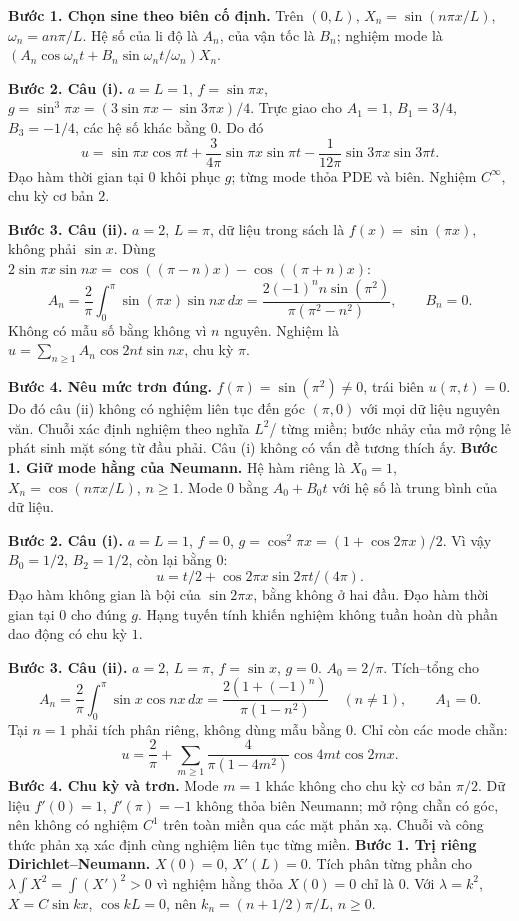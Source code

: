 \textbf{Bước 1. Chọn sine theo biên cố định.} Trên $(0,L)$, $X_n=\sin(n\pi x/L)$, $\omega_n=an\pi/L$. Hệ số của li độ là $A_n$, của vận tốc là $B_n$; nghiệm mode là $(A_n\cos\omega_nt+B_n\sin\omega_nt/\omega_n)X_n$.

\textbf{Bước 2. Câu (i).} $a=L=1$, $f=\sin\pi x$, $g=\sin^3\pi x=(3\sin\pi x-\sin3\pi x)/4$. Trực giao cho $A_1=1$, $B_1=3/4$, $B_3=-1/4$, các hệ số khác bằng $0$. Do đó
\[u=\sin\pi x\cos\pi t+\frac3{4\pi}\sin\pi x\sin\pi t-\frac1{12\pi}\sin3\pi x\sin3\pi t.\]
Đạo hàm thời gian tại $0$ khôi phục $g$; từng mode thỏa PDE và biên. Nghiệm $C^\infty$, chu kỳ cơ bản $2$.

\textbf{Bước 3. Câu (ii).} $a=2$, $L=\pi$, dữ liệu trong sách là $f(x)=\sin(\pi x)$, không phải $\sin x$. Dùng $2\sin\pi x\sin nx=\cos((\pi-n)x)-\cos((\pi+n)x)$:
\[A_n=\frac2\pi\int_0^\pi\sin(\pi x)\sin nx\,dx
=\frac{2(-1)^nn\sin(\pi^2)}{\pi(\pi^2-n^2)},\qquad B_n=0.\]
Không có mẫu số bằng không vì $n$ nguyên. Nghiệm là $u=\sum_{n\ge1}A_n\cos2nt\sin nx$, chu kỳ $\pi$.

\textbf{Bước 4. Nêu mức trơn đúng.} $f(\pi)=\sin(\pi^2)\ne0$, trái biên $u(\pi,t)=0$. Do đó câu (ii) không có nghiệm liên tục đến góc $(\pi,0)$ với mọi dữ liệu nguyên văn. Chuỗi xác định nghiệm theo nghĩa $L^2$/ từng miền; bước nhảy của mở rộng lẻ phát sinh mặt sóng từ đầu phải. Câu (i) không có vấn đề tương thích ấy.
\textbf{Bước 1. Giữ mode hằng của Neumann.} Hệ hàm riêng là $X_0=1$, $X_n=\cos(n\pi x/L)$, $n\ge1$. Mode $0$ bằng $A_0+B_0t$ với hệ số là trung bình của dữ liệu.

\textbf{Bước 2. Câu (i).} $a=L=1$, $f=0$, $g=\cos^2\pi x=(1+\cos2\pi x)/2$. Vì vậy $B_0=1/2$, $B_2=1/2$, còn lại bằng $0$:
\[u=t/2+\cos2\pi x\sin2\pi t/(4\pi).\]
Đạo hàm không gian là bội của $\sin2\pi x$, bằng không ở hai đầu. Đạo hàm thời gian tại $0$ cho đúng $g$. Hạng tuyến tính khiến nghiệm không tuần hoàn dù phần dao động có chu kỳ $1$.

\textbf{Bước 3. Câu (ii).} $a=2$, $L=\pi$, $f=\sin x$, $g=0$. $A_0=2/\pi$. Tích–tổng cho
\[A_n=\frac2\pi\int_0^\pi\sin x\cos nx\,dx
=\frac{2(1+(-1)^n)}{\pi(1-n^2)}\quad(n\ne1),\qquad A_1=0.\]
Tại $n=1$ phải tích phân riêng, không dùng mẫu bằng $0$. Chỉ còn các mode chẵn:
\[u=\frac2\pi+\sum_{m\ge1}\frac4{\pi(1-4m^2)}\cos4mt\cos2mx.\]
\textbf{Bước 4. Chu kỳ và trơn.} Mode $m=1$ khác không cho chu kỳ cơ bản $\pi/2$. Dữ liệu $f'(0)=1$, $f'(\pi)=-1$ không thỏa biên Neumann; mở rộng chẵn có góc, nên không có nghiệm $C^1$ trên toàn miền qua các mặt phản xạ. Chuỗi và công thức phản xạ xác định cùng nghiệm liên tục từng miền.
\textbf{Bước 1. Trị riêng Dirichlet–Neumann.} $X(0)=0$, $X'(L)=0$. Tích phân từng phần cho $\lambda\int X^2=\int(X')^2>0$ vì nghiệm hằng thỏa $X(0)=0$ chỉ là $0$. Với $\lambda=k^2$, $X=C\sin kx$, $\cos kL=0$, nên $k_n=(n+1/2)\pi/L$, $n\ge0$.

